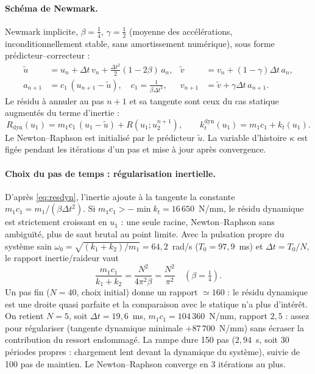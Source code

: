 \documentclass[11pt,a4paper]{article}
\begin{document}
\paragraph{Schéma de Newmark.}
Newmark implicite, $\beta=\tfrac14$, $\gamma=\tfrac12$ (moyenne des accélérations,
inconditionnellement stable, sans amortissement numérique), sous forme prédicteur--correcteur :
\begin{align}
  \tilde u &= u_n + \Delta t\,v_n + \tfrac{\Delta t^2}{2}(1-2\beta)\,a_n, &
  \tilde v &= v_n + (1-\gamma)\Delta t\,a_n,\\
  a_{n+1} &= c_1\,(u_{n+1}-\tilde u),\quad c_1 = \frac{1}{\beta\Delta t^2}, &
  v_{n+1} &= \tilde v + \gamma\Delta t\,a_{n+1}.
\end{align}
Le résidu à annuler au pas $n+1$ et sa tangente sont ceux du cas statique augmentés du terme
d'inertie :
\begin{equation}
  R_{\text{dyn}}(u_1) = m_1c_1\,(u_1-\tilde u) + R(u_1;u_2^{n+1}),\qquad
  k_t^{\text{dyn}}(u_1) = m_1c_1 + k_t(u_1).
  \label{eq:resdyn}
\end{equation}
Le Newton--Raphson est initialisé par le prédicteur $\tilde u$. La variable d'histoire $\kappa$ est
figée pendant les itérations d'un pas et mise à jour après convergence.

\paragraph{Choix du pas de temps : régularisation inertielle.}
D'après \eqref{eq:resdyn}, l'inertie ajoute à la tangente la constante $m_1c_1 = m_1/(\beta\Delta t^2)$.
Si $m_1c_1 > -\min k_t = 16\,650$~N/mm, le résidu dynamique est strictement croissant en $u_1$ : une
seule racine, Newton--Raphson sans ambiguïté, plus de saut brutal au point limite. Avec la pulsation
propre du système sain $\omega_0=\sqrt{(k_1+k_2)/m_1} = 64{,}2$~rad/s ($T_0 = 97{,}9$~ms) et
$\Delta t = T_0/N$, le rapport inertie/raideur vaut
\begin{equation}
  \frac{m_1c_1}{k_1+k_2} = \frac{N^2}{4\pi^2\beta} = \frac{N^2}{\pi^2}\quad(\beta=\tfrac14).
\end{equation}
Un pas fin ($N=40$, choix initial) donne un rapport $\simeq160$ : le résidu dynamique est une droite
quasi parfaite et la comparaison avec le statique n'a plus d'intérêt. On retient $N=5$,
soit $\Delta t = 19{,}6$~ms, $m_1c_1 = 104\,360$~N/mm, rapport $2{,}5$ : assez pour régulariser
(tangente dynamique minimale $+87\,700$~N/mm) sans écraser la contribution du ressort endommagé. La
rampe dure 150 pas ($2{,}94$~s, soit 30 périodes propres : chargement lent devant la dynamique du
système), suivie de 100 pas de maintien. Le Newton--Raphson converge en 3 itérations au plus.
\end{document}
